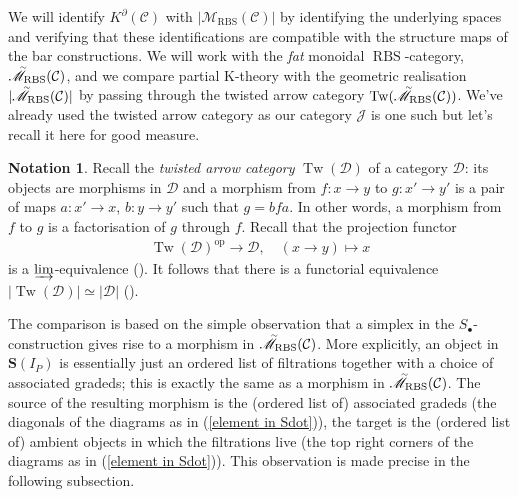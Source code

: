 \documentclass[12pt, reqno]{amsart}
\theoremstyle{plain}
\theoremstyle{definition}
\newtheorem{notation}[theorem]{Notation}
\begin{document}
We will identify $K^\partial(\mathcal{C})$ with $|\mathscr{M}_{\operatorname{RBS}}(\mathcal{C})|$ by identifying the underlying spaces and verifying that these identifications are compatible with the structure maps of the bar constructions. We will work with the \textit{fat} monoidal $\operatorname{RBS}$-category, $\accentset{\sim}{\mathscr{M}}_{\operatorname{RBS}}(\mathcal{C})$, and we compare partial K-theory with the geometric realisation $|\accentset{\sim}{\mathscr{M}}_{\operatorname{RBS}}(\mathcal{C})|$ by passing through the twisted arrow category $\operatorname{Tw}(\accentset{\sim}{\mathscr{M}}_{\operatorname{RBS}}(\mathcal{C}))$. We've already used the twisted arrow category as our category $\mathcal{J}$ is one such but let's recall it here for good measure.

\begin{notation}
Recall the \textit{twisted arrow category} $\operatorname{Tw}(\mathcal{D})$ of a category $\mathcal{D}$: its objects are morphisms in $\mathcal{D}$ and a morphism from $f\colon x\rightarrow y$ to $g\colon x'\rightarrow y'$ is a pair of maps $a\colon x'\rightarrow x$, $b\colon y\rightarrow y'$ such that $g=bfa$. In other words, a morphism from $f$ to $g$ is a factorisation of $g$ through $f$. Recall that the projection functor
\begin{align*}
\operatorname{Tw}(\mathcal{D})^{\operatorname{op}}\rightarrow \mathcal{D},\quad (x\rightarrow y)\mapsto x
\end{align*}
is a $\varinjlim$-equivalence (\cite[Lemma 4.16]{ClausenOrsnesJansen}). It follows that there is a functorial equivalence $|\operatorname{Tw}(\mathcal{D})|\simeq |\mathcal{D}|$ (\cite[Remark 2.20 and Corollary 2.11]{ClausenOrsnesJansen}).
\end{notation}

The comparison is based on the simple observation that a simplex in the $S_\bullet$-construction gives rise to a morphism in $\accentset{\sim}{\mathscr{M}}_{\operatorname{RBS}}(\mathcal{C})$. More explicitly, an object in $\mathbf{S}(I_P)$ is essentially just an ordered list of filtrations together with a choice of associated gradeds; this is exactly the same as a morphism in $\accentset{\sim}{\mathscr{M}}_{\operatorname{RBS}}(\mathcal{C})$. The source of the resulting morphism is the (ordered list of) associated gradeds (the diagonals of the diagrams as in (\ref{element in Sdot})), the target is the (ordered list of) ambient objects in which the filtrations live (the top right corners of the diagrams as in (\ref{element in Sdot})). This observation is made precise in the following subsection.
\end{document}
